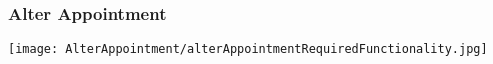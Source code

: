 \subsubsection{Alter Appointment}
		\texttt{[image: AlterAppointment/alterAppointmentRequiredFunctionality.jpg]}